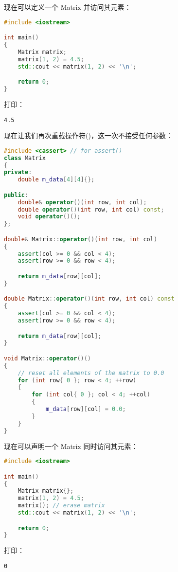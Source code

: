 \documentclass[../../LearnCpp.tex]{subfiles}
\begin{document}
现在可以定义一个 Matrix 并访问其元素：

\begin{lstlisting}[language=C++]
#include <iostream>

int main()
{
    Matrix matrix;
    matrix(1, 2) = 4.5;
    std::cout << matrix(1, 2) << '\n';

    return 0;
}
\end{lstlisting}

打印：

\begin{lstlisting}
4.5
\end{lstlisting}

现在让我们再次重载操作符()，这一次不接受任何参数：

\begin{lstlisting}[language=C++]
#include <cassert> // for assert()
class Matrix
{
private:
    double m_data[4][4]{};

public:
    double& operator()(int row, int col);
    double operator()(int row, int col) const;
    void operator()();
};

double& Matrix::operator()(int row, int col)
{
    assert(col >= 0 && col < 4);
    assert(row >= 0 && row < 4);

    return m_data[row][col];
}

double Matrix::operator()(int row, int col) const
{
    assert(col >= 0 && col < 4);
    assert(row >= 0 && row < 4);

    return m_data[row][col];
}

void Matrix::operator()()
{
    // reset all elements of the matrix to 0.0
    for (int row{ 0 }; row < 4; ++row)
    {
        for (int col{ 0 }; col < 4; ++col)
        {
            m_data[row][col] = 0.0;
        }
    }
}
\end{lstlisting}

现在可以声明一个 Matrix 同时访问其元素：

\begin{lstlisting}[language=C++]
#include <iostream>

int main()
{
    Matrix matrix{};
    matrix(1, 2) = 4.5;
    matrix(); // erase matrix
    std::cout << matrix(1, 2) << '\n';

    return 0;
}
\end{lstlisting}

打印：

\begin{lstlisting}
0
\end{lstlisting}
\end{document}
